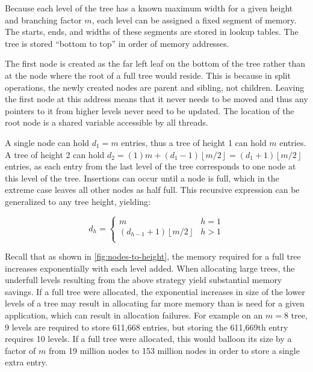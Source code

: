 Because each level of the tree has a known maximum width for a given height and
branching factor $m$, each level can be assigned a fixed segment of memory. The
starts, ends, and widths of these segments are stored in lookup tables. The tree
is stored ``bottom to top'' in order of memory addresses.

The first node is created as the far left leaf on the bottom of the tree rather
than at the node where the root of a full tree would reside. This is because in
split operations, the newly created nodes are parent and sibling, not children.
Leaving the first node at this address means that it never needs to be moved and
thus any pointers to it from higher levels never need to be updated. The
location of the root node is a shared variable accessible by all threads.


A single node can hold $d_1=m$ entries, thus a tree of height 1 can hold $m$
entries. A tree of height 2 can hold $d_2 = (1)m +
(d_1-1)\left\lfloor{m/2}\right\rfloor = (d_1+1)\left\lfloor{m/2}\right\rfloor$
entries, as each entry from the last level of the tree corresponds to one node
at this level of the tree. Insertions can occur until a node is full, which in
the extreme case leaves all other nodes as half full.
%
This recursive expression can be generalized to any tree height, yielding:

{\ssp$$
	d_h = \begin{cases}
		m & h = 1 \\
		(d_{h-1}+1)\left\lfloor{m/2}\right\rfloor & h > 1 \\
	\end{cases}
$$}

Recall that as shown in \autoref{fig:nodes-to-height}, the memory required for a
full tree increases exponentially with each level added. When allocating large
trees, the underfull levels resulting from the above strategy yield substantial
memory savings. If a full tree were allocated, the exponential increases in size
of the lower levels of a tree may result in allocating far more memory than is
need for a given application, which can result in allocation failures.
%
For example on an $m=8$ tree, 9 levels are required to store 611,668 entries,
but storing the 611,669th entry requires 10 levels. If a full tree were
allocated, this would balloon its size by a factor of $m$ from 19 million nodes
to 153 million nodes in order to store a single extra entry.

